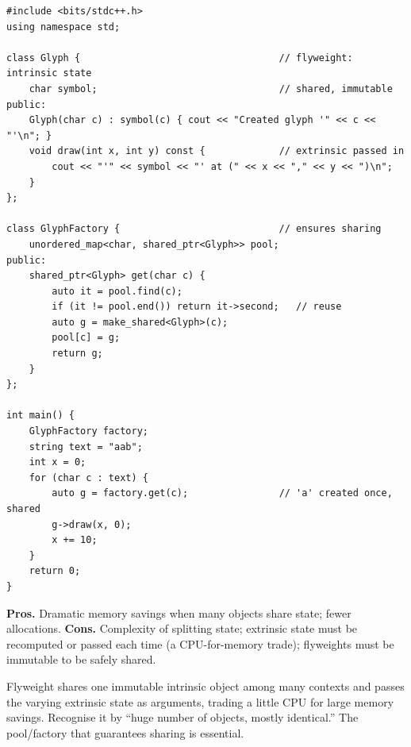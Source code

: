 \begin{lstlisting}
#include <bits/stdc++.h>
using namespace std;

class Glyph {                                   // flyweight: intrinsic state
    char symbol;                                // shared, immutable
public:
    Glyph(char c) : symbol(c) { cout << "Created glyph '" << c << "'\n"; }
    void draw(int x, int y) const {             // extrinsic passed in
        cout << "'" << symbol << "' at (" << x << "," << y << ")\n";
    }
};

class GlyphFactory {                            // ensures sharing
    unordered_map<char, shared_ptr<Glyph>> pool;
public:
    shared_ptr<Glyph> get(char c) {
        auto it = pool.find(c);
        if (it != pool.end()) return it->second;   // reuse
        auto g = make_shared<Glyph>(c);
        pool[c] = g;
        return g;
    }
};

int main() {
    GlyphFactory factory;
    string text = "aab";
    int x = 0;
    for (char c : text) {
        auto g = factory.get(c);                // 'a' created once, shared
        g->draw(x, 0);
        x += 10;
    }
    return 0;
}
\end{lstlisting}

\begin{complexitybox}
\textbf{Pros.} Dramatic memory savings when many objects share state;
fewer allocations. \textbf{Cons.} Complexity of splitting state; extrinsic
state must be recomputed or passed each time (a CPU-for-memory trade);
flyweights must be immutable to be safely shared.
\end{complexitybox}

\begin{takeawaybox}
Flyweight shares one immutable intrinsic object among many contexts and
passes the varying extrinsic state as arguments, trading a little CPU for
large memory savings. Recognise it by ``huge number of objects, mostly
identical.'' The pool/factory that guarantees sharing is essential.
\end{takeawaybox}
